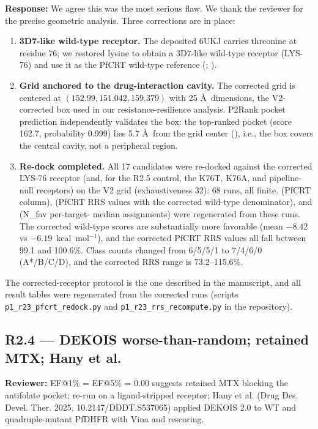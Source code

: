 \documentclass[11pt]{article}
\begin{document}
\textbf{Response:} We agree this was the most serious flaw. We thank the reviewer for the
precise geometric analysis. Three corrections are in place:
\begin{enumerate}[leftmargin=1.6em]
\item \textbf{3D7-like wild-type receptor.} The deposited 6UKJ carries threonine at residue 76;
we restored lysine to obtain a 3D7-like wild-type receptor (LYS-76) and use it as the PfCRT
wild-type reference (; ).
\item \textbf{Grid anchored to the drug-interaction cavity.} The corrected grid is centered at
$(152.99, 151.042, 159.379)$ with 25 \AA\ dimensions, the V2-corrected box used in our
resistance-resilience analysis. P2Rank pocket prediction independently validates the box: the
top-ranked pocket (score 162.7, probability 0.999) lies 5.7 \AA\ from the grid center (), i.e., the box covers the central cavity, not a peripheral region.
\item \textbf{Re-dock completed.} All 17 candidates were re-docked against the corrected
LYS-76 receptor (and, for the R2.5 control, the K76T, K76A, and pipeline-null receptors) on
the V2 grid (exhaustiveness 32): 68 runs, all finite.  (PfCRT column), 
(PfCRT RRS values with the corrected wild-type denominator), and  (N\_fav per-target-
median assignments) were regenerated from these runs. The corrected wild-type scores are
substantially more favorable (mean $-8.42$ vs $-6.19$~kcal~mol$^{-1}$), and the corrected
PfCRT RRS values all fall between 99.1 and 100.6\%. Class counts changed from 6/5/5/1 to
7/4/6/0 (A*/B/C/D), and the corrected RRS range is 73.2--115.6\%.
\end{enumerate}
The corrected-receptor protocol is the one described in the manuscript, and all result tables
were regenerated from the corrected runs (scripts \texttt{p1\_r23\_pfcrt\_redock.py} and
\texttt{p1\_r23\_rrs\_recompute.py} in the repository).

\subsection*{R2.4 --- DEKOIS worse-than-random; retained MTX; Hany et al.}
\textbf{Reviewer:} EF@1\% = EF@5\% = 0.00 suggests retained MTX blocking the antifolate pocket;
re-run on a ligand-stripped receptor; Hany et al. (Drug Des. Devel. Ther. 2025,
10.2147/DDDT.S537065) applied DEKOIS 2.0 to WT and quadruple-mutant PfDHFR with Vina and
rescoring.
\end{document}

